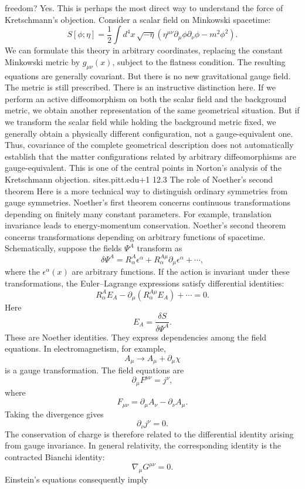 freedom? Yes. This is perhaps the most direct way to understand the force of
Kretschmann's objection. Consider a scalar field on Minkowski spacetime: \[
    S[\phi;\eta]= \frac12\int d^4x\,\sqrt{-\eta} \left(
    \eta^{\mu\nu}\partial_\mu\phi\partial_\nu\phi -m^2\phi^2 \right). \] We can
formulate this theory in arbitrary coordinates, replacing the constant
Minkowski metric by \(g_{\mu\nu}(x)\), subject to the flatness condition. The
resulting equations are generally covariant. But there is no new gravitational
gauge field. The metric is still prescribed. There is an instructive
distinction here. If we perform an active diffeomorphism on both the scalar
field and the background metric, we obtain another representation of the same
geometrical situation. But if we transform the scalar field while holding the
background metric fixed, we generally obtain a physically different
configuration, not a gauge-equivalent one. Thus, covariance of the complete
geometrical description does not automatically establish that the matter
configurations related by arbitrary diffeomorphisms are gauge-equivalent. This
is one of the central points in Norton's analysis of the Kretschmann objection.
sites.pitt.edu+1 12.3 The role of Noether's second theorem Here is a more
technical way to distinguish ordinary symmetries from gauge symmetries.
Noether's first theorem concerns continuous transformations depending on
finitely many constant parameters. For example, translation invariance leads to
energy-momentum conservation. Noether's second theorem concerns transformations
depending on arbitrary functions of spacetime. Schematically, suppose the
fields \(\Psi^A\) transform as \[ \delta\Psi^A = R^A_{\alpha}\epsilon^\alpha +
R^{A\mu}_{\alpha}\partial_\mu\epsilon^\alpha +\cdots, \] where the
\(\epsilon^\alpha(x)\) are arbitrary functions. If the action is invariant
under these transformations, the Euler–Lagrange expressions satisfy
differential identities: \[ \boxed{ R^{A}_{\alpha}E_A
-\partial_\mu(R^{A\mu}_{\alpha}E_A) +\cdots=0. } \] Here \[ E_A=\frac{\delta
S}{\delta\Psi^A}. \] These are Noether identities. They express dependencies
among the field equations. In electromagnetism, for example, \[
    A_\mu\longrightarrow A_\mu+\partial_\mu\chi \] is a gauge transformation.
The field equations are \[ \partial_\mu F^{\mu\nu}=j^\nu, \] where \[
    F_{\mu\nu}=\partial_\mu A_\nu-\partial_\nu A_\mu. \] Taking the divergence
gives \[ \partial_\nu j^\nu=0. \] The conservation of charge is therefore
related to the differential identity arising from gauge invariance. In general
relativity, the corresponding identity is the contracted Bianchi identity: \[
    \boxed{\nabla_\mu G^{\mu\nu}=0.} \] Einstein's equations consequently imply
